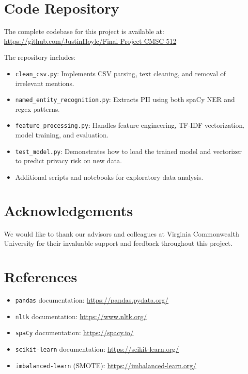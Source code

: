 \documentclass{article}
\begin{document}
\section{Code Repository}
The complete codebase for this project is available at:
\url{https://github.com/JustinHoyle/Final-Project-CMSC-512}

The repository includes:
\begin{itemize}
    \item \texttt{clean\_csv.py}: Implements CSV parsing, text cleaning, and removal of irrelevant mentions.
    \item \texttt{named\_entity\_recognition.py}: Extracts PII using both spaCy NER and regex patterns.
    \item \texttt{feature\_processing.py}: Handles feature engineering, TF-IDF vectorization, model training, and evaluation.
    \item \texttt{test\_model.py}: Demonstrates how to load the trained model and vectorizer to predict privacy risk on new data.
    \item Additional scripts and notebooks for exploratory data analysis.
\end{itemize}

\section{Acknowledgements}
We would like to thank our advisors and colleagues at Virginia Commonwealth University for their invaluable support and feedback throughout this project.

\section*{References}
\begin{itemize}
    \item \texttt{pandas} documentation: \url{https://pandas.pydata.org/}
    \item \texttt{nltk} documentation: \url{https://www.nltk.org/}
    \item \texttt{spaCy} documentation: \url{https://spacy.io/}
    \item \texttt{scikit-learn} documentation: \url{https://scikit-learn.org/}
    \item \texttt{imbalanced-learn} (SMOTE): \url{https://imbalanced-learn.org/}
\end{itemize}
\end{document}
